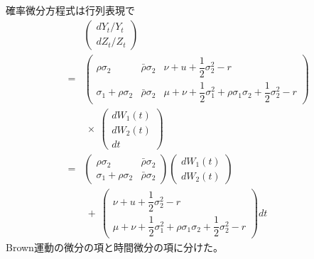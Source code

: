 \documentclass[uplatex,a4j,12pt,dvipdfmx]{jsarticle}
\begin{document}
確率微分方程式は行列表現で
%
%
\begin{eqnarray*}
	&&
	\left(
	\begin{array}{c}
		d Y_{t} / Y_{t}
		\\[2mm]
		d Z_{t} / Z_{t}
	\end{array}
	\right)
	\\ &=&
	\left(
	\begin{array}{ccc}
		\rho \sigma_{2}              & \bar{\rho} \sigma_{2} & \nu + u + \dfrac{1}{2} \sigma_{2}^{2} - r
		\\
		\sigma_{1} + \rho \sigma_{2} & \bar{\rho} \sigma_{2} & \mu + \nu + \dfrac{1}{2} \sigma_{1}^{2} + \rho \sigma_{1} \sigma_{2} + \dfrac{1}{2} \sigma_{2}^{2} - r
	\end{array}
	\right)
	\\ && \ \times \
	\left(
	\begin{array}{c}
		dW_{1}(t)
		\\
		dW_{2}(t)
		\\
		dt
	\end{array}
	\right)
	\\ &=&
	\left(
	\begin{array}{cc}
		\rho \sigma_{2}              & \bar{\rho} \sigma_{2}
		\\
		\sigma_{1} + \rho \sigma_{2} & \bar{\rho} \sigma_{2}
	\end{array}
	\right)
	\left(
	\begin{array}{c}
		dW_{1}(t)
		\\
		dW_{2}(t)
	\end{array}
	\right)
	\\ && \ + \
	\left(
	\begin{array}{c}
		\nu + u + \dfrac{1}{2} \sigma_{2}^{2} - r
		\\
		\mu + \nu + \dfrac{1}{2} \sigma_{1}^{2} + \rho \sigma_{1} \sigma_{2} + \dfrac{1}{2} \sigma_{2}^{2} - r
	\end{array}
	\right)
	dt
\end{eqnarray*}
%
%
Brown運動の微分の項と時間微分の項に分けた。
\end{document}
